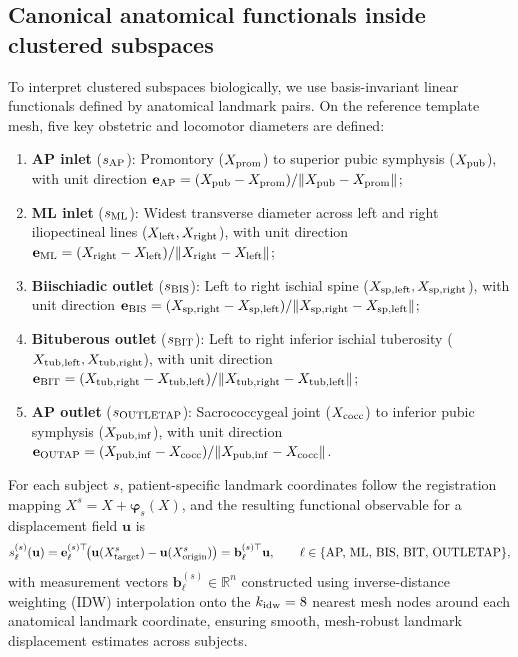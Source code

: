 \documentclass[11pt]{article}
\begin{document}
\subsection{Canonical anatomical functionals inside clustered subspaces}
\label{sec:canonical-methods}

To interpret clustered subspaces biologically, we use basis-invariant linear functionals defined by anatomical landmark pairs.
On the reference template mesh, five key obstetric and locomotor diameters are defined:
\begin{enumerate}[label=(\roman*)]
\item \textbf{AP inlet} ($s_{\rm AP}$): Promontory ($X_{\rm prom}$) to superior pubic symphysis ($X_{\rm pub}$), with unit direction $\mathbf e_{\rm AP} = (X_{\rm pub} - X_{\rm prom}) / \|X_{\rm pub} - X_{\rm prom}\|$;
\item \textbf{ML inlet} ($s_{\rm ML}$): Widest transverse diameter across left and right iliopectineal lines ($X_{\rm left}, X_{\rm right}$), with unit direction $\mathbf e_{\rm ML} = (X_{\rm right} - X_{\rm left}) / \|X_{\rm right} - X_{\rm left}\|$;
\item \textbf{Biischiadic outlet} ($s_{\rm BIS}$): Left to right ischial spine ($X_{\rm sp,left}, X_{\rm sp,right}$), with unit direction $\mathbf e_{\rm BIS} = (X_{\rm sp,right} - X_{\rm sp,left}) / \|X_{\rm sp,right} - X_{\rm sp,left}\|$;
\item \textbf{Bituberous outlet} ($s_{\rm BIT}$): Left to right inferior ischial tuberosity ($X_{\rm tub,left}, X_{\rm tub,right}$), with unit direction $\mathbf e_{\rm BIT} = (X_{\rm tub,right} - X_{\rm tub,left}) / \|X_{\rm tub,right} - X_{\rm tub,left}\|$;
\item \textbf{AP outlet} ($s_{\rm OUTLETAP}$): Sacrococcygeal joint ($X_{\rm cocc}$) to inferior pubic symphysis ($X_{\rm pub,inf}$), with unit direction $\mathbf e_{\rm OUTAP} = (X_{\rm pub,inf} - X_{\rm cocc}) / \|X_{\rm pub,inf} - X_{\rm cocc}\|$.
\end{enumerate}
For each subject $s$, patient-specific landmark coordinates follow the registration mapping $X^s = X + \boldsymbol\varphi_s(X)$, and the resulting functional observable for a displacement field $\mathbf u$ is
\begin{equation}
s_\ell^{(s)}(\mathbf u) = \mathbf e_\ell^{(s)\top}\! \big(\mathbf u(X_{\rm target}^s) - \mathbf u(X_{\rm origin}^s)\big) = \mathbf b_\ell^{(s)\top}\mathbf u, \qquad \ell \in \{\text{AP, ML, BIS, BIT, OUTLETAP}\},
\label{eq:functional-score}
\end{equation}
with measurement vectors $\mathbf b_\ell^{(s)} \in \mathbb R^n$ constructed using inverse-distance weighting (IDW) interpolation onto the $k_{\rm idw}=8$ nearest mesh nodes around each anatomical landmark coordinate, ensuring smooth, mesh-robust landmark displacement estimates across subjects.
\end{document}
